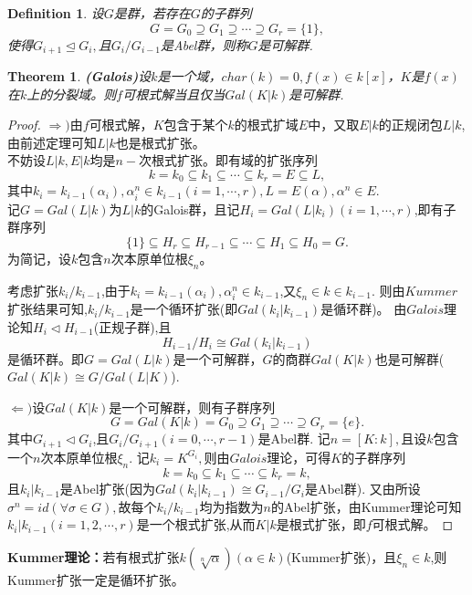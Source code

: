 \documentclass[UTF8]{article}
\newtheorem{thm}{Theorem}[section]
\newtheorem{defn}{Definition}[section]
\begin{document}
\begin{defn}
设$G$是群，若存在$G$的子群列
$$
G=G_{0}\supseteq G_{1}\supseteq \cdots\supseteq G_{r}=\{1\},
$$
使得$G_{i+1}\trianglelefteq G_{i},$且$G_{i}/G_{i-1}$是Abel群，则称$G$是可解群.
\end{defn}
\begin{thm}
\textbf{(Galois)}设$k$是一个域，$char(k)=0,f(x)\in k[x]$，$K$是$f(x)$在$k$上的分裂域。则$f$可根式解当且仅当$Gal(K|k)$是可解群.
\end{thm}
\begin{proof}
	$\Rightarrow)$由$f$可根式解，$K$包含于某个$k$的根式扩域$E$中，又取$E|k$的正规闭包$L|k$,由前述定理可知$L|k$也是根式扩张。\\
	不妨设$L|k,E|k$均是$n-$次根式扩张。即有域的扩张序列
	$$
	k=k_{0}\subseteq k_{1}\subseteq \cdots\subseteq k_{r}=E\subseteq L,
	$$
	其中$k_{i}=k_{i-1}(\alpha_{i}),\alpha_{i}^{n}\in k_{i-1}(i=1,\cdots,r),L=E(\alpha),\alpha^{n}\in E.$\\
	记$G=Gal(L|k)$为$L|k$的Galois群，且记$H_{i}=Gal(L|k_{i})(i=1,\cdots,r)$,即有子群序列
	$$
	\{1\}\subseteq H_{r}\subseteq H_{r-1}\subseteq \cdots\subseteq H_{1}\subseteq H_{0}=G.
	$$
	为简记，设$k$包含$n$次本原单位根$\xi_{n}$。
	
	
	考虑扩张$k_{i}/k_{i-1}$,由于$k_{i}=k_{i-1}(\alpha_{i}),\alpha_{i}^{n}\in k_{i-1}$,又$\xi_{n}\in k\in k_{i-1}$.
	则由$Kummer$扩张结果可知,$k_{i}/k_{i-1}$是一个循环扩张(即$Gal(k_{i}|k_{i-1})$是循环群)。
	由$Galois$理论知$H_{i}\triangleleft H_{i-1}$(正规子群),且
	$$H_{i-1}/H_{i}\cong Gal(k_{i}|k_{i-1})$$
	是循环群。即$G=Gal(L|k)$是一个可解群，$G$的商群$Gal(K|k)$也是可解群($Gal(K|k)\cong G/Gal(L|K)$).
	
	
	$\Leftarrow)$设$Gal(K|k)$是一个可解群，则有子群序列
	$$
	G=Gal(K|k)=G_{0}\supseteq G_{1}\supseteq \cdots\supseteq G_{r}=\{e\}.
	$$
	其中$G_{i+1}\triangleleft G_{i}$,且$G_{i}/G_{i+1}(i=0,\cdots,r-1)$是Abel群.
	记$n=[K:k],$且设$k$包含一个$n$次本原单位根$\xi_{n}.$
	记$k_{i}=K^{G_{i}},$则由$Galois$理论，可得$K$的子群序列
	$$
	k=k_{0}\subseteq k_{1}\subseteq \cdots\subseteq k_{r}=k,
	$$
	且$k_{i}|k_{i-1}$是Abel扩张(因为$Gal(k_{i}|k_{i-1})\cong G_{i-1}/G_{i}$是Abel群).
	又由所设$\sigma^{n}=id(\forall \sigma \in G),$故每个$k_{i}/k_{i-1}$均为指数为$n$的Abel扩张，由Kummer理论可知$k_{i}|k_{i-1}(i=1,2,\cdots,r)$是一个根式扩张,从而$K|k$是根式扩张，即$f$可根式解。
\end{proof}


\textbf{Kummer理论：}若有根式扩张$k(\sqrt[n]{\alpha})(\alpha\in k)$(Kummer扩张)，且$\xi_{n}\in k$,则Kummer扩张一定是循环扩张。
\end{document}
